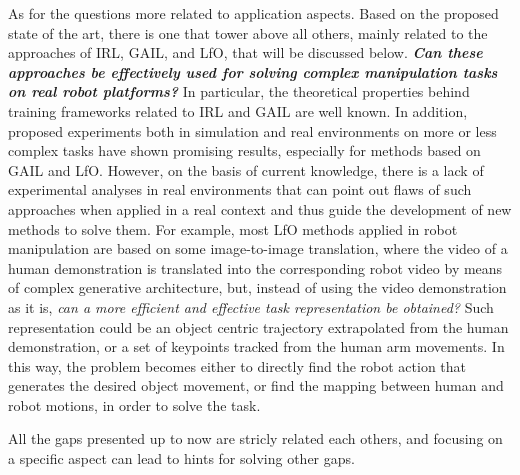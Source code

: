 As for the questions more related to application aspects. Based on the proposed state of the art, there is one that tower above all others, mainly related to the approaches of IRL, GAIL, and LfO, that will be discussed below.
\newline \textbf{\textit{Can these approaches be effectively used for solving complex manipulation tasks on real robot platforms?}} In particular, the theoretical properties behind training frameworks related to IRL and GAIL are well known. In addition, proposed experiments both in simulation and real environments on more or less complex tasks have shown promising results, especially for methods based on GAIL and LfO. However, on the basis of current knowledge, there is a lack of experimental analyses in real environments that can point out flaws of such approaches when applied in a real context and thus guide the development of new methods to solve them. For example, most LfO methods applied in robot manipulation are based on some image-to-image translation, where the video of a human demonstration is translated into the corresponding robot video by means of complex generative architecture, but, instead of using the video demonstration as it is, \textit{can a more efficient and effective task representation be obtained?} Such representation could be an object centric trajectory extrapolated from the human demonstration, or a set of keypoints tracked from the human arm movements. In this way, the problem becomes either to directly find the robot action that generates the desired object movement, or find the mapping between human and robot motions, in order to solve the task.

All the gaps presented up to now are stricly related each others, and focusing on a specific aspect can lead to hints for solving other gaps.